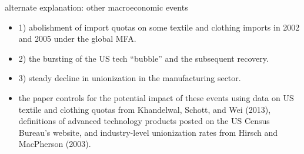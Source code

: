 \documentclass[10pt]{beamer}
\begin{document}
\begin{frame}{alternate explanation: other macroeconomic events}
\label{other}
\begin{itemize}
	\item 1) abolishment of import quotas on some textile and clothing imports in 2002 and 2005 under the global MFA.
	\item 2) the bursting of the US tech “bubble” and the subsequent recovery. 
	\item 3) steady decline in unionization in the manufacturing sector. 
	\item the paper controls for the potential impact of these events using data on US textile and clothing quotas from Khandelwal, Schott, and Wei (2013), definitions of advanced technology products posted on the US Census Bureau’s website, and industry-level unionization rates from Hirsch and MacPherson (2003). 
\end{itemize}
	
\end{frame}
\end{document}
